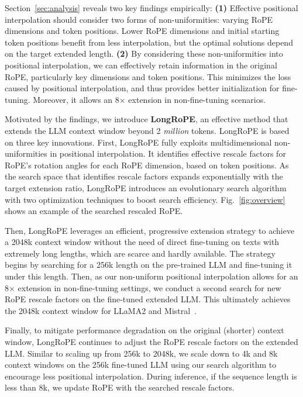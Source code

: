 Section~\ref{sec:analysis} reveals two key findings empirically: \textbf{(1)} Effective positional interpolation should consider two forms of non-uniformities: varying RoPE dimensions and token positions. Lower RoPE dimensions and initial starting token positions benefit from less interpolation, but the optimal solutions depend on the target extended length.
  \textbf{(2)} By considering these non-uniformities into positional interpolation, we can effectively retain information in the original RoPE,  particularly key dimensions and token positions. This minimizes the loss caused by positional interpolation, and thus provides better initialization for fine-tuning. Moreover, it  allows an 8$\times$ extension in non-fine-tuning scenarios. 

  Motivated by the findings, we introduce \textbf{LongRoPE},  an effective method that extends the LLM context window beyond 2 \emph{million} tokens.  LongRoPE is based on three key innovations. First, {LongRoPE} fully exploits multidimensional non-uniformities in positional interpolation. It identifies effective rescale factors for RoPE's rotation angles for each RoPE dimension, based on token positions. As the search space that identifies rescale factors expands exponentially with the target extension ratio, {LongRoPE} introduces an evolutionary search algorithm with two optimization techniques to boost search efficiency. Fig.~\ref{fig:overview} shows an example of the searched  rescaled RoPE.

 Then, {LongRoPE} leverages an efficient, progressive extension strategy to achieve a 2048k context window without the need of direct fine-tuning on texts with extremely long lengths, which are scarce and hardly available. The strategy begins by searching for a 256k length on the pre-trained LLM and fine-tuning it under this length. Then, as our non-uniform positional interpolation allows for an 8$\times$ extension in non-fine-tuning settings, we conduct a second search for new RoPE rescale factors on the fine-tuned extended LLM. This ultimately achieves the 2048k context window for LLaMA2 and Mistral~\cite{mistral}.

Finally, to mitigate performance degradation on the original (shorter) context window, {LongRoPE} continues to adjust the RoPE rescale factors on the extended LLM. Similar to scaling up from 256k to 2048k, we scale down to 4k and 8k context windows on the 256k fine-tuned LLM using our search algorithm to encourage less positional interpolation. During inference, if the sequence length is less than 8k, we update RoPE with the searched rescale factors. 

